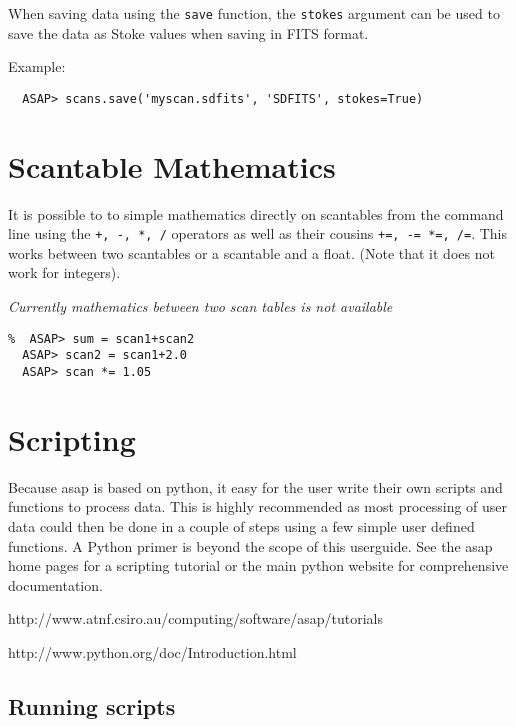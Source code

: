 \documentclass[11pt]{article}
\newcommand{\cmd}[1]{{\tt #1}}
\begin{document}
When saving data using the \cmd{save}
function, the \cmd{stokes} argument can be used to save the data as
Stoke values when saving in FITS format.

Example:

\begin{verbatim}
  ASAP> scans.save('myscan.sdfits', 'SDFITS', stokes=True)
\end{verbatim}

\section{Scantable Mathematics}

It is possible to to simple mathematics
directly on scantables from the command line using the \cmd{+, -, *,
/} operators as well as their cousins \cmd{+=, -= *=, /=}. This works
between two scantables or a scantable and a float. (Note that it does
not work for integers).

{\em Currently mathematics between two scan tables is not available }

\begin{verbatim}
%  ASAP> sum = scan1+scan2
  ASAP> scan2 = scan1+2.0
  ASAP> scan *= 1.05
\end{verbatim}

\section{Scripting}

Because asap is based on python, it easy for the user
write their own scripts and functions to process data. This is highly
recommended as most processing of user data could then be done in a
couple of steps using a few simple user defined functions. A Python
primer is beyond the scope of this userguide. See the asap home pages
for a scripting tutorial or the main python website for comprehensive
documentation.

\hspace{1cm} http://www.atnf.csiro.au/computing/software/asap/tutorials

\hspace{1cm} http://www.python.org/doc/Introduction.html

\subsection{Running scripts}
\end{document}
